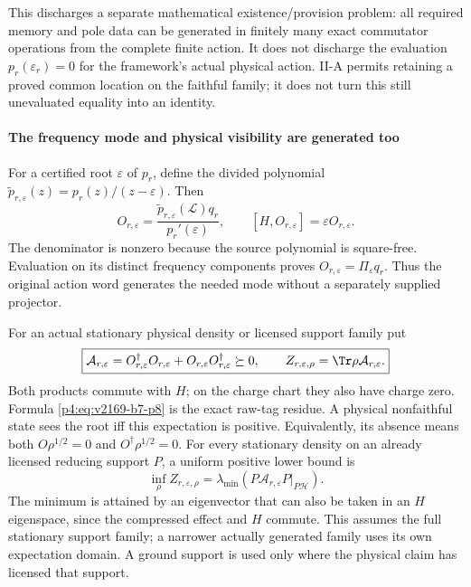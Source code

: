 \documentclass[12pt,a4paper]{article}
\begin{document}
This discharges a separate mathematical existence/provision problem: all
required memory and pole data can be generated in finitely many exact
commutator operations from the complete finite action. It does not discharge
the evaluation $p_r(\varepsilon_r)=0$ for the framework's actual physical
action. II-A permits retaining a proved common location on the faithful
family; it does not turn this still unevaluated equality into an identity.



\paragraph{The frequency mode and physical visibility are generated too}
For a certified root $\varepsilon$ of $p_r$, define the divided polynomial
$\widetilde p_{r,\varepsilon}(z)=p_r(z)/(z-\varepsilon)$. Then
\begin{equation}
 \boxed{O_{r,\varepsilon}
    =\frac{\widetilde p_{r,\varepsilon}(\mathcal L)q_r}
           {p_r'(\varepsilon)},\qquad
       [H,O_{r,\varepsilon}]=\varepsilon O_{r,\varepsilon}.}
 \label{p4:eq:v2169-b7-p7}
\end{equation}
The denominator is nonzero because the source polynomial is square-free.
Evaluation on its distinct frequency components proves
$O_{r,\varepsilon}=\Pi_\varepsilon q_r$. Thus the original action word
generates the needed mode without a separately supplied projector.

For an actual stationary physical density or licensed support family put
\begin{equation}
 \boxed{\mathcal A_{r,\varepsilon}
       =O_{r,\varepsilon}^\dagger O_{r,\varepsilon}
        +O_{r,\varepsilon}O_{r,\varepsilon}^\dagger\succeq0,\qquad
       Z_{r,\varepsilon,\rho}=\Tr\rho\mathcal A_{r,\varepsilon}.}
 \label{p4:eq:v2169-b7-p8}
\end{equation}
Both products commute with $H$; on the charge chart they also have charge
zero. Formula \eqref{p4:eq:v2169-b7-p8} is the exact raw-tag residue. A physical nonfaithful
state sees the root iff this expectation is positive. Equivalently, its
absence means both $O\rho^{1/2}=0$ and $O^\dagger\rho^{1/2}=0$.
For every stationary density on an already licensed reducing support $P$, a
uniform positive lower bound is
\begin{equation}
 \inf_\rho Z_{r,\varepsilon,\rho}
       =\lambda_{\min}(P\mathcal A_{r,\varepsilon}P|_{P\mathcal H}).
 \label{p4:eq:v2169-b7-p9}
\end{equation}
The minimum is attained by an eigenvector that can also be taken in an
$H$ eigenspace, since the compressed effect and $H$ commute. This assumes
the full stationary support family; a narrower actually generated family
uses its own expectation domain. A ground support is used only where the
physical claim has licensed that support.
\end{document}
